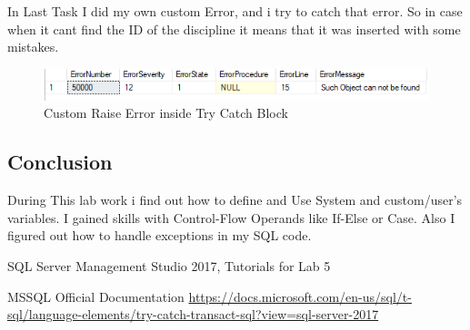 \documentclass[12pt]{article}
\begin{document}
        In Last Task I did my own custom Error, and i try to catch that error. So in case when it cant find the ID of the discipline it means that it was inserted with some mistakes.
        \begin{figure}[H]
                \centering
                \includegraphics[width=1\textwidth]{img5.png}
                \caption{Custom Raise Error inside Try Catch Block }
        \end{figure}
        \vspace{0.5 cm}



        \newpage 
        \subsection*{Conclusion}
        During This lab work i find out how to define and Use System and custom/user's variables. I gained skills with Control-Flow Operands like If-Else or Case. Also I figured out how to handle exceptions in my SQL code.  
        \cite{SQLServerManagementStudio}
        

 
\medskip
 
\begin{thebibliography}{9}
SQL Server Management Studio 2017, Tutorials for Lab 5

MSSQL Official Documentation
\url{https://docs.microsoft.com/en-us/sql/t-sql/language-elements/try-catch-transact-sql?view=sql-server-2017}
\end{thebibliography}
                
\end{document}
